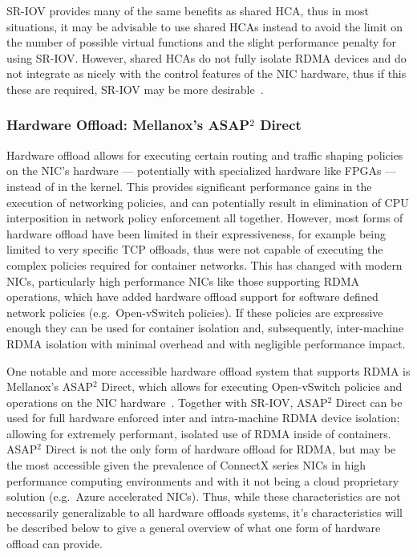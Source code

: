 \documentclass[12pt,titlepage]{article}
\begin{document}
SR-IOV provides many of the same benefits as shared HCA, thus in most situations, it may be advisable to use shared HCAs instead to avoid the limit on the number of possible virtual functions and the slight performance penalty for using SR-IOV\@.
However, shared HCAs do not fully isolate RDMA devices and do not integrate as nicely with the control features of the NIC hardware, thus if this these are required, SR-IOV may be more desirable~\cite{mlnxofedmanual,mellanoxdockersriov}.

\subsubsection{Hardware Offload: Mellanox's ASAP$^2$ Direct}
Hardware offload allows for executing certain routing and traffic shaping policies on the NIC's hardware --- potentially with specialized hardware like FPGAs --- instead of in the kernel.
This provides significant performance gains in the execution of networking policies, and can potentially result in elimination of CPU interposition in network policy enforcement all together.
However, most forms of hardware offload have been limited in their expressiveness, for example being limited to very specific TCP offloads, thus were not capable of executing the complex policies required for container networks.
This has changed with modern NICs, particularly high performance NICs like those supporting RDMA operations, which have added hardware offload support for software defined network policies (e.g.\ Open-vSwitch policies).
If these policies are expressive enough they can be used for container isolation and, subsequently, inter-machine RDMA isolation with minimal overhead and with negligible performance impact.

One notable and more accessible hardware offload system that supports RDMA is Mellanox's ASAP$^2$ Direct, which allows for executing Open-vSwitch policies and operations on the NIC hardware~\cite{mellanoxdockerovs}.
Together with SR-IOV, ASAP$^2$ Direct can be used for full hardware enforced inter and intra-machine RDMA device isolation;
allowing for extremely performant, isolated use of RDMA inside of containers.
ASAP$^2$ Direct is not the only form of hardware offload for RDMA, but may be the most accessible given the prevalence of ConnectX series NICs in high performance computing environments and with it not being a cloud proprietary solution (e.g.\ Azure accelerated NICs).
Thus, while these characteristics are not necessarily generalizable to all hardware offloads systems, it's characteristics will be described below to give a general overview of what one form of hardware offload can provide.
\end{document}
